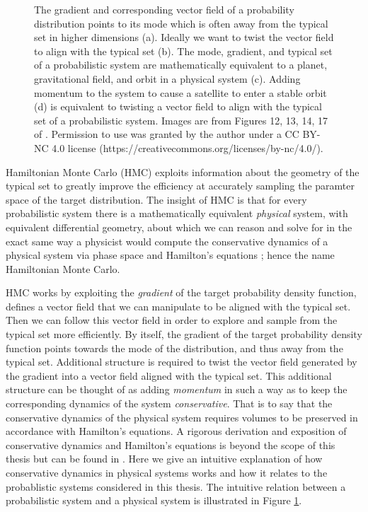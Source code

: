 \begin{figure}
	\caption{The gradient and corresponding vector field of a probability distribution points to its mode which is often away from the typical set in higher dimensions (a). Ideally we want to twist the vector field to align with the typical set (b). The mode, gradient, and typical set of a probabilistic system are mathematically equivalent to a planet, gravitational field, and orbit in a physical system (c). Adding momentum to the system to cause a satellite to enter a stable orbit (d) is equivalent to twisting a vector field to align with the typical set of a probabilistic system. Images are from Figures 12, 13, 14, 17 of \cite{Betancourt2017}. Permission to use was granted by the author under a CC BY-NC 4.0 license (https://creativecommons.org/licenses/by-nc/4.0/).}
	\label{fig:hmc}
\end{figure}

Hamiltonian Monte Carlo (HMC) exploits information about the geometry of the typical set to greatly improve the efficiency at accurately sampling the paramter space of the target distribution. The insight of HMC is that for every probabilistic system there is a mathematically equivalent \textit{physical} system, with equivalent differential geometry, about which we can reason and solve for in the exact same way a physicist would compute the conservative dynamics of a physical system via phase space and Hamilton's equations \cite{Betancourt2017}; hence the name Hamiltonian Monte Carlo.

HMC works by exploiting the \textit{gradient} of the target probability density function, defines a vector field that we can manipulate to be aligned with the typical set. Then we can follow this vector field in order to explore and sample from the typical set more efficiently. By itself, the gradient of the target probability density function points towards the mode of the distribution, and thus away from the typical set. Additional structure is required to twist the vector field generated by the gradient into a vector field aligned with the typical set. This additional structure can be thought of as adding \textit{momentum} in such a way as to keep the corresponding dynamics of the system \textit{conservative}. That is to say that the conservative dynamics of the physical system requires volumes to be preserved in accordance with Hamilton's equations. A rigorous derivation and exposition of conservative dynamics and Hamilton's equations is beyond the scope of this thesis but can be found in \cite{Betancourt2017}. Here we give an intuitive explanation of how conservative dynamics in physical systems works and how it relates to the probablistic systems considered in this thesis. The intuitive relation between a probabilistic system and a physical system is illustrated in Figure \ref{fig:hmc}.

